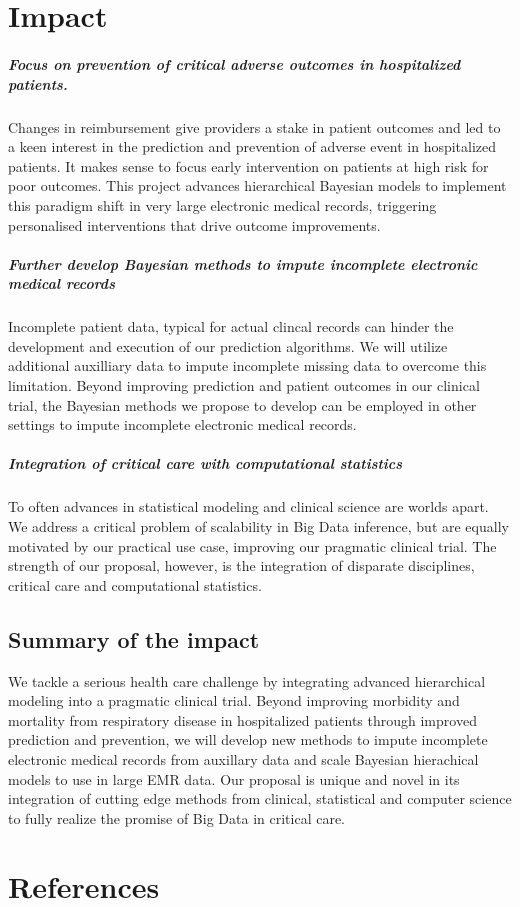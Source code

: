 \documentclass[]{article}
\begin{document}
\section{Impact}\label{impact}

\subparagraph{Focus on prevention of critical adverse outcomes in
hospitalized
patients.}\label{focus-on-prevention-of-critical-adverse-outcomes-in-hospitalized-patients.}

Changes in reimbursement give providers a stake in patient outcomes and
led to a keen interest in the prediction and prevention of adverse event
in hospitalized patients. It makes sense to focus early intervention on
patients at high risk for poor outcomes. This project advances
hierarchical Bayesian models to implement this paradigm shift in very
large electronic medical records, triggering personalised interventions
that drive outcome improvements.

\subparagraph{Further develop Bayesian methods to impute incomplete
electronic medical
records}\label{further-develop-bayesian-methods-to-impute-incomplete-electronic-medical-records}

Incomplete patient data, typical for actual clincal records can hinder
the development and execution of our prediction algorithms. We will
utilize additional auxilliary data to impute incomplete missing data to
overcome this limitation. Beyond improving prediction and patient
outcomes in our clinical trial, the Bayesian methods we propose to
develop can be employed in other settings to impute incomplete
electronic medical records.

\subparagraph{Integration of critical care with computational
statistics}\label{integration-of-critical-care-with-computational-statistics}

To often advances in statistical modeling and clinical science are
worlds apart. We address a critical problem of scalability in Big Data
inference, but are equally motivated by our practical use case,
improving our pragmatic clinical trial. The strength of our proposal,
however, is the integration of disparate disciplines, critical care and
computational statistics.

\subsection{Summary of the impact}\label{summary-of-the-impact}

We tackle a serious health care challenge by integrating advanced
hierarchical modeling into a pragmatic clinical trial. Beyond improving
morbidity and mortality from respiratory disease in hospitalized
patients through improved prediction and prevention, we will develop new
methods to impute incomplete electronic medical records from auxillary
data and scale Bayesian hierachical models to use in large EMR data. Our
proposal is unique and novel in its integration of cutting edge methods
from clinical, statistical and computer science to fully realize the
promise of Big Data in critical care.

\section*{References}\label{references}
\end{document}
